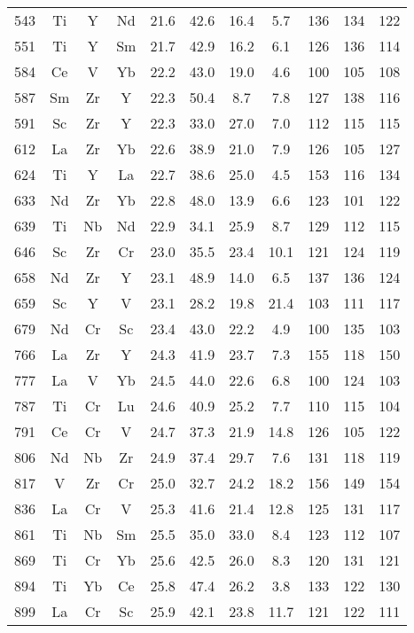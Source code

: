 \begin{center}
\begin{xtabular}{c|ccc|cccc|ccc}
 543 &  Ti &  Y &  Nd & 21.6 & 42.6 & 16.4 & 5.7 & 136 & 134 & 122 \\
 551 &  Ti &  Y &  Sm & 21.7 & 42.9 & 16.2 & 6.1 & 126 & 136 & 114 \\
 584 &  Ce &  V &  Yb & 22.2 & 43.0 & 19.0 & 4.6 & 100 & 105 & 108 \\
 587 &  Sm &  Zr &  Y & 22.3 & 50.4 & 8.7 & 7.8 & 127 & 138 & 116 \\
 591 &  Sc &  Zr &  Y & 22.3 & 33.0 & 27.0 & 7.0 & 112 & 115 & 115 \\
 612 &  La &  Zr &  Yb & 22.6 & 38.9 & 21.0 & 7.9 & 126 & 105 & 127 \\
 624 &  Ti &  Y &  La & 22.7 & 38.6 & 25.0 & 4.5 & 153 & 116 & 134 \\
 633 &  Nd &  Zr &  Yb & 22.8 & 48.0 & 13.9 & 6.6 & 123 & 101 & 122 \\
 639 &  Ti &  Nb &  Nd & 22.9 & 34.1 & 25.9 & 8.7 & 129 & 112 & 115 \\
 646 &  Sc &  Zr &  Cr & 23.0 & 35.5 & 23.4 & 10.1 & 121 & 124 & 119 \\
 658 &  Nd &  Zr &  Y & 23.1 & 48.9 & 14.0 & 6.5 & 137 & 136 & 124 \\
 659 &  Sc &  Y &  V & 23.1 & 28.2 & 19.8 & 21.4 & 103 & 111 & 117 \\
 679 &  Nd &  Cr &  Sc & 23.4 & 43.0 & 22.2 & 4.9 & 100 & 135 & 103 \\
 766 &  La &  Zr &  Y & 24.3 & 41.9 & 23.7 & 7.3 & 155 & 118 & 150 \\
 777 &  La &  V &  Yb & 24.5 & 44.0 & 22.6 & 6.8 & 100 & 124 & 103 \\
 787 &  Ti &  Cr &  Lu & 24.6 & 40.9 & 25.2 & 7.7 & 110 & 115 & 104 \\
 791 &  Ce &  Cr &  V & 24.7 & 37.3 & 21.9 & 14.8 & 126 & 105 & 122 \\
 806 &  Nd &  Nb &  Zr & 24.9 & 37.4 & 29.7 & 7.6 & 131 & 118 & 119 \\
 817 &  V &  Zr &  Cr & 25.0 & 32.7 & 24.2 & 18.2 & 156 & 149 & 154 \\
 836 &  La &  Cr &  V & 25.3 & 41.6 & 21.4 & 12.8 & 125 & 131 & 117 \\
 861 &  Ti &  Nb &  Sm & 25.5 & 35.0 & 33.0 & 8.4 & 123 & 112 & 107 \\
 869 &  Ti &  Cr &  Yb & 25.6 & 42.5 & 26.0 & 8.3 & 120 & 131 & 121 \\
 894 &  Ti &  Yb &  Ce & 25.8 & 47.4 & 26.2 & 3.8 & 133 & 122 & 130 \\
 899 &  La &  Cr &  Sc & 25.9 & 42.1 & 23.8 & 11.7 & 121 & 122 & 111 \\

\end{xtabular}
\end{center}
